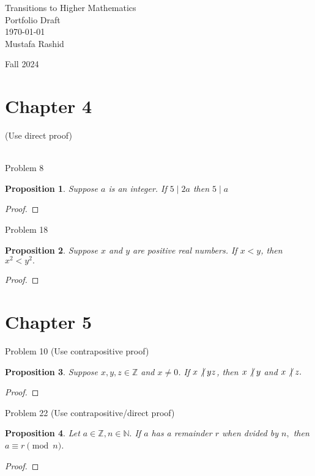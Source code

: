 \documentclass[12pt,letterpaper, onecolumn]{exam}
\newtheorem*{prop}{Proposition}
\newcommand{\doesnotdivide}{\not\hspace{2.5pt}\mid}
\begin{document}
	\begingroup  
	\centering
	\LARGE Transitions to Higher Mathematics\\
	\LARGE Portfolio Draft\\[0.5em]
	\large \today\\[0.5em]
	\large Mustafa Rashid\par
	\large Fall 2024\par
	\endgroup

	\section{Chapter 4}(Use direct proof)\\
	\\
	\centerline {Problem 8}
	\begin{prop}
	Suppose $a$ is an integer. If $5\mid 2a$ then $5\mid a$
	\end{prop}
	
	\begin{proof}
		
	
	\end{proof}
	\centerline{Problem 18}
	\begin{prop}
		Suppose $x$ and $y$ are positive real numbers. If $x<y$, then $x^2<y^2.$
	\end{prop}
	
	\begin{proof}
		
		
	\end{proof}
		\section{Chapter 5}
	\centerline{Problem 10 (Use contrapositive proof)}
	\begin{prop}
	Suppose $x,y,z\in \mathbb{Z}$ and $x\neq0$. If $x\doesnotdivide yz$, then $x\doesnotdivide y$ and $x\doesnotdivide z.$
	\end{prop}
	
	\begin{proof}
	
	\end{proof}
		\centerline{Problem 22 (Use contrapositive/direct proof)}
	\begin{prop}
		Let $a\in \mathbb{Z}, n\in \mathbb{N}.$ If $a$ has a remainder $r$ when dvided by $n,$ then $a\equiv r \pmod n$.
	\end{prop}
	
	\begin{proof}
		
	\end{proof}
	
\end{document}
